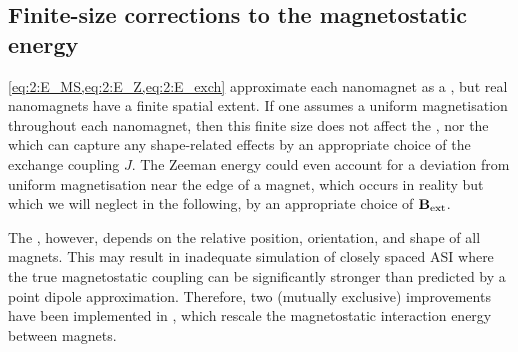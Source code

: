 \subsection{Finite-size corrections to the magnetostatic energy}\label{sec:2:finite}
\cref{eq:2:E_MS,eq:2:E_Z,eq:2:E_exch} approximate each nanomagnet as a , but real nanomagnets have a finite spatial extent.
If one assumes a uniform magnetisation throughout each nanomagnet, then this finite size does not affect the , nor the  which can capture any shape-related effects by an appropriate choice of the exchange coupling $J$.
The Zeeman energy could even account for a deviation from uniform magnetisation near the edge of a magnet, which occurs in reality but which we will neglect in the following, by an appropriate choice of $\boldsymbol{\mathbf{B}}_\mathrm{ext}$. \par
The , however, depends on the relative position, orientation, and shape of all magnets.
This may result in inadequate simulation of closely spaced ASI where the true magnetostatic coupling can be significantly stronger than predicted by a point dipole approximation.
Therefore, two (mutually exclusive) improvements have been implemented in \hotspice, which rescale the magnetostatic interaction energy between magnets.

